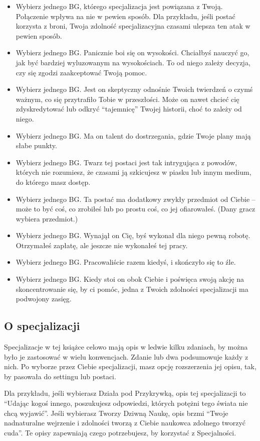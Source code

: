 \begin{itemize}
\item Wybierz jednego BG, którego specjalizacja jest powiązana z Twoją. Połączenie wpływa na nie w pewien sposób. Dla przykładu, jeśli postać korzysta z broni, Twoja zdolność specjalizacyjna czasami ulepsza ten atak w pewien sposób.
\item Wybierz jednego BG. Panicznie boi się on wysokości. Chciałbyś nauczyć go, jak być bardziej wyluzowanym na wysokościach. To od niego zależy decyzja, czy się zgodzi zaakceptować Twoją pomoc.
\item Wybierz jednego BG. Jest on skeptyczny odnośnie Twoich twierdzeń o czymś ważnym, co się przytrafiło Tobie w przeszłości. Może on nawet chcieć cię zdyskredytować lub odkryć “tajemnicę” Twojej historii, choć to zależy od niego.
\item Wybierz jednego BG. Ma on talent do dostrzegania, gdzie Twoje plany mają słabe punkty.
\item Wybierz jednego BG. Twarz tej postaci jest tak intrygująca z powodów, których nie rozumiesz, że czasami ją szkicujesz w piasku lub innym medium, do którego masz dostęp.
\item Wybierz jednego BG. Ta postać ma dodatkowy zwykły przedmiot od Ciebie – może to być coś, co zrobiłeś lub po prostu coś, co jej ofiarowałeś. (Dany gracz wybiera przedmiot.)
\item Wybierz jednego BG. Wynajął on Cię, byś wykonał dla niego pewną robotę. Otrzymałeś zapłatę, ale jeszcze nie wykonałeś tej pracy.
\item Wybierz jednego BG. Pracowaliście razem kiedyś, i skończyło się to źle.
\item Wybierz jednego BG. Kiedy stoi on obok Ciebie i poświęca swoją akcję na skoncentrowanie się, by ci pomóc,  jedna z Twoich zdolności specjalizacji ma podwojony zasięg.
\end{itemize}

\subsection{O specjalizacji}

Specjalizacje w tej książce celowo mają opis w ledwie kilku zdaniach, by można było je zastosować w wielu konwencjach. Zdanie lub dwa podsumowuje każdy z nich. Po wyborze przez Ciebie specjalizacji, masz opcję rozszerzenia jej opisu, tak, by pasowała do settingu lub postaci.

Dla przykładu, jeśli wybierasz Działa pod Przykrywką, opis tej specjalizacji to “Udając kogoś innego, poszukujesz odpowiedzi, których potężni tego świata nie chcą wyjawić”. Jeśli wybierasz Tworzy Dziwną Naukę, opis brzmi “Twoje nadnaturalne wejrzenie i zdolności tworzą z Ciebie naukowca zdolnego tworzyć cuda”. Te opisy zapewniają czego potrzebujesz, by korzystać z Specjalności.

